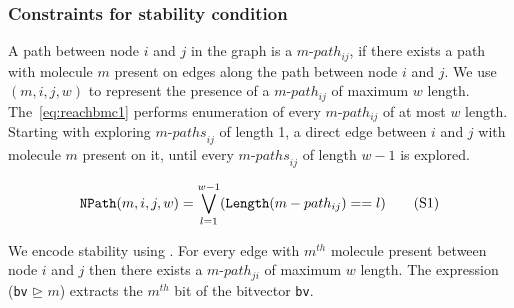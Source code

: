 \subsubsection{Constraints for stability condition}
%
A path between node $i$ and $j$ in the graph is a $m$-$path_{ij}$, if there exists a path with molecule $m$ present on edges along the path between node $i$ and $j$.
%
%
We use {\npath}$(m, i, j, w)$ to represent the presence of a $m$-$path_{ij}$ of maximum $w$ length.
%
%
The~\ref{eq:reachbmc1} performs enumeration of every $m$-$path_{ij}$ of at most $w$ length. 
%
Starting with exploring $m$-${paths}_{ij}$ of length 1, a direct edge between $i$ and $j$ with molecule $m$ present on it, until every $m$-${paths}_{ij}$ of length $w-1$ is explored.


\begin{align}
\texttt{NPath}(m, i, j, w) = \bigvee\limits_{l = 1}^{w-1} (\texttt{Length} (m-path_{ij}) == l)
  \tag{S1}\label{eq:reachbmc1}
\end{align}

We encode stability using \npath. For every edge with $m^{th}$ molecule present between node $i$ and $j$ then there exists a $m$-$path_{ji}$ of maximum $w$ length.
%
The expression (\texttt{bv} $\unrhd$ $m$) extracts the $m^{th}$ bit of the bitvector \texttt{bv}. 

